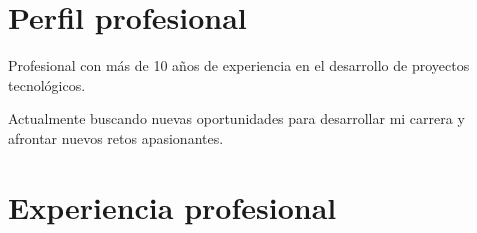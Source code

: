 \documentclass[letterpaper]{twentysecondcv} %
\begin{document}
\makeprofile %

\section{Perfil profesional}
Profesional con más de 10 años de experiencia en el desarrollo de proyectos tecnológicos.

Actualmente buscando nuevas oportunidades para desarrollar mi carrera y afrontar nuevos retos apasionantes.


\section{Experiencia profesional}
\end{document}
